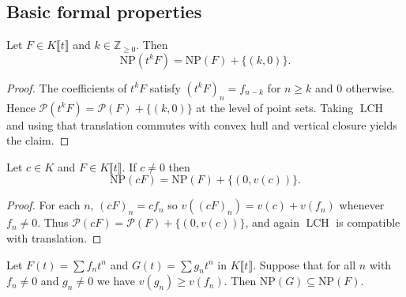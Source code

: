 \subsection{Basic formal properties}

\begin{lemma}
  \label{lem:newton_polygon_tpow}
  
  \leanok
  Let $F\in K\llbracket t\rrbracket$ and $k\in\mathbb{Z}_{\ge 0}$.
  Then
  \[
    \mathrm{NP}(t^k F)=\mathrm{NP}(F) + \{(k,0)\}.
  \]
\end{lemma}

\begin{proof}
 
  \leanok
  The coefficients of $t^kF$ satisfy $(t^kF)_n=f_{n-k}$ for $n\ge k$ and $0$ otherwise.
  Hence $\mathcal{P}(t^kF)=\mathcal{P}(F)+\{(k,0)\}$ at the level of point sets.
  Taking $\operatorname{LCH}$ and using that translation commutes with convex hull and vertical closure yields the claim.
\end{proof}

\begin{lemma}
  \label{lem:newton_polygon_smul}
  
  \leanok
  Let $c\in K$ and $F\in K\llbracket t\rrbracket$.
  If $c\neq 0$ then
  \[
    \mathrm{NP}(cF)=\mathrm{NP}(F)+\{(0,v(c))\}.
  \]
\end{lemma}

\begin{proof}
 
  \leanok
  For each $n$, $(cF)_n=c f_n$ so $v((cF)_n)=v(c)+v(f_n)$ whenever $f_n\neq 0$.
  Thus $\mathcal{P}(cF)=\mathcal{P}(F)+\{(0,v(c))\}$, and again $\operatorname{LCH}$ is compatible with translation.
\end{proof}

\begin{lemma}
  \label{lem:newton_polygon_monotone}
  
  \leanok
  Let $F(t)=\sum f_n t^n$ and $G(t)=\sum g_n t^n$ in $K\llbracket t\rrbracket$.
  Suppose that for all $n$ with $f_n\neq 0$ and $g_n\neq 0$ we have $v(g_n)\ge v(f_n)$.
  Then $\mathrm{NP}(G)\subseteq \mathrm{NP}(F)$.
\end{lemma}

